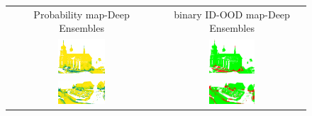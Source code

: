     \begin{figure}[h!]
        \centering
        \begin{tabular}{cc}
            Probability map-Deep Ensembles & binary ID-OOD map-Deep Ensembles \\
            \includegraphics[width=0.33\textwidth, height=0.18\textheight]{images/ood_imgs/de_sem3d/de_prob_10_1.pdf}& 
            \includegraphics[width=0.33\textwidth, height=0.18\textheight]{images/ood_imgs/de_sem3d/de_ood_auroc_1.pdf}\\

            \includegraphics[width=0.33\textwidth, height=0.18\textheight]{images/ood_imgs/de_sem3d/de_prob_10_2.pdf}& 
            \includegraphics[width=0.33\textwidth, height=0.18\textheight]{images/ood_imgs/de_sem3d/de_ood_auroc_2.pdf}\\


\end{tabular}
\end{figure}

